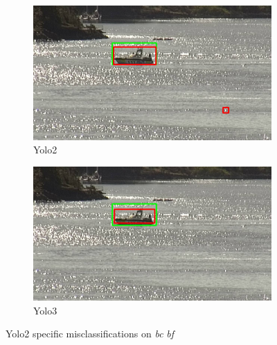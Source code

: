 \begin{figure}[h!]
\begin{subfigure}{.5\textwidth}
  \centering
  \includegraphics[width=0.9\linewidth]{results/case_buildings/yolo23/grove/yolo2/selected_08_11_frame1070.jpg}
  \caption{Yolo2}
\end{subfigure}%
\begin{subfigure}{.5\textwidth}
  \centering
  \includegraphics[width=.9\linewidth]{results/case_buildings/yolo23/grove/yolo3/selected_08_11_frame1070.jpg}
  \caption{Yolo3}
\end{subfigure}
\caption{Yolo2 specific misclassifications on \textit{bc} \textit{bf}}
\label{img:yolo2_misclas}

\end{figure}

\newpage

